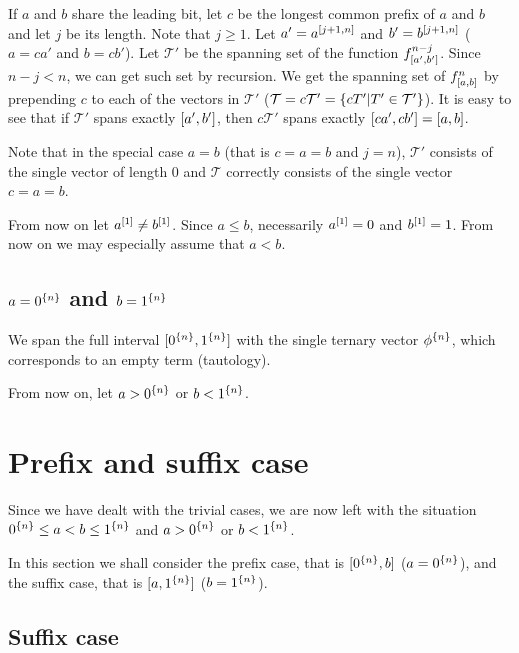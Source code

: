 If $a$ and $b$ share the leading bit,
let $c$ be the longest common prefix of $a$ and $b$
and let $j$ be its length.
Note that $j \geq 1$.
Let $a' = a^{[j+1, n]}$ and $b' = b^{[j+1, n]}$
($a = ca'$ and $b = cb'$).
Let $\mathcal{T}'$ be the spanning set of
the function $f^{n-j}_{[a', b']}$.
Since $n-j < n$,
we can get such set by recursion.
We get the spanning set of $f^{n}_{[a, b]}$
by prepending $c$
to each of the vectors in $\mathcal{T}'$
($\mathcal{T} = c \mathcal{T}'
= \{cT' | T' \in \mathcal{T}'\}$).
It is easy to see that if $\mathcal{T}'$
spans exactly $[a', b']$,
then $c \mathcal{T}'$ spans exactly
$[c a', c b'] = [a, b]$.

Note that in the special case $a=b$
(that is $c=a=b$ and $j=n$),
$\mathcal{T}'$ consists of the single vector of length $0$
and $\mathcal{T}$ correctly consists of the single vector $c=a=b$.

From now on let $a^{[1]} \neq b^{[1]}$.
Since $a \leq b$,
necessarily $a^{[1]} = 0$ and $b^{[1]} = 1$.
From now on we may especially assume that $a < b$.

\subsection{\texorpdfstring
{$a = 0^{\{n\}}$}{a = }
and
\texorpdfstring{$b = 1^{\{n\}}$}{b = }
}

We span the full interval
$[0^{\{n\}}, 1^{\{n\}}]$
with the single ternary vector $\phi^{\{n\}}$,
which corresponds to an empty term (tautology).

From now on,
let $a > 0^{\{n\}}$ or $b < 1^{\{n\}}$.

\section{Prefix and suffix case}
\label{sec:prefixsuffix}


Since we have dealt with the trivial cases,
we are now left with the situation
$0^{\{n\}} \leq a < b \leq 1^{\{n\}}$
and
$a > 0^{\{n\}}$ or $b < 1^{\{n\}}$.

In this section we shall consider the prefix case,
that is $[0^{\{n\}}, b]$ ($a = 0^{\{n\}}$),
and the suffix case,
that is $[a, 1^{\{n\}}]$ ($b = 1^{\{n\}}$).

\subsection{Suffix case}

